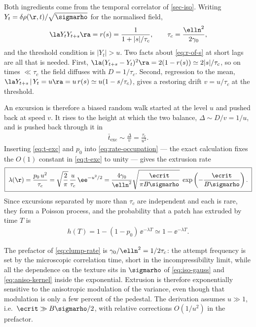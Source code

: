 Both ingredients come from the temporal correlator of \cref{sec-iso}. Writing $Y_t = \delta\rho(\r,t)/\sqrt{\sigmarho}$ for the normalised field,
\begin{align}
    \label{eq:r-of-s}
    \la Y_tY_{t+s}\ra = r(s) = \frac{1}{1+|s|/\tau_c},
    \qquad
    \tau_c = \frac{\elln^2}{2\gamma_0},
\end{align}
and the threshold condition is $|Y_t|>u$. Two facts about \eqref{eq:r-of-s} at short lags are all that is needed. First, $\la(Y_{t+s}-Y_t)^2\ra = 2(1-r(s)) \simeq 2|s|/\tau_c$, so on times $\ll\tau_c$ the field diffuses with $D=1/\tau_c$. Second, regression to the mean, $\la Y_{t+s}\,|\,Y_t=u\ra = u\,r(s) \simeq u(1-s/\tau_c)$, gives a restoring drift $v = u/\tau_c$ at the threshold.

An excursion is therefore a biased random walk started at the level $u$ and pushed back at speed $v$. It rises to the height at which the two balance, $\Delta \sim D/v = 1/u$, and is pushed back through it in
\begin{align}
    \label{eq:t-exc}
    \bar t_\mathrm{exc} \sim \frac{\Delta}{v} = \frac{\tau_c}{u^2}.
\end{align}
Inserting \eqref{eq:t-exc} and $p_0$ into \eqref{eq:rate-occupation} --- the exact calculation fixes the $O(1)$ constant in \eqref{eq:t-exc} to unity --- gives the extrusion rate
\begin{align}
    \label{eq:clump-rate}
    \boxed{\;
    \lambda(\r) = \frac{p_0\,u^2}{\tau_c} = \sqrt{\frac{2}{\pi}}\,\frac{u}{\tau_c}\,\ee^{-u^2/2}
    = \frac{4\gamma_0}{\elln^2}\sqrt{\frac{\ecrit}{\pi B\sigmarho}}\;
      \exp\left(-\frac{\ecrit}{B\sigmarho}\right).
    \;}
\end{align}
Since excursions separated by more than $\tau_c$ are independent and each is rare, they form a Poisson process, and the probability that a patch has extruded by time $T$ is
\begin{align}
    \label{eq:h-of-T}
    h(T) = 1-(1-p_0)\,\ee^{-\lambda T} \simeq 1 - \ee^{-\lambda T}.
\end{align}

The prefactor of \eqref{eq:clump-rate} is $\gamma_0/\elln^2 = 1/2\tau_c$: the attempt frequency is set by the microscopic correlation time, short in the incompressibility limit, while all the dependence on the texture sits in $\sigmarho$ of \eqref{eq:iso-gauss} and \eqref{eq:aniso-kernel} inside the exponential. Extrusion is therefore exponentially sensitive to the anisotropic modulation of the variance, even though that modulation is only a few percent of the pedestal. The derivation assumes $u\gg1$, i.e.\ $\ecrit\gg B\sigmarho/2$, with relative corrections $O(1/u^2)$ in the prefactor.




